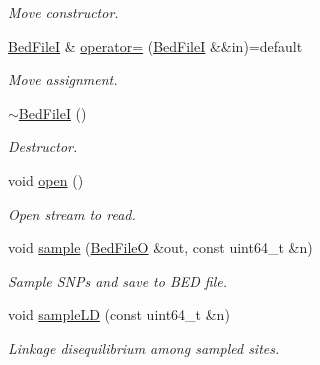 \begin{DoxyCompactItemize}
\begin{DoxyCompactList}\small\item\em Move constructor. \end{DoxyCompactList}\item 
\mbox{\label{classsamp_files_1_1_bed_file_i_a9c99aae36f0c6d710f7940affe35cf58}} 
\hyperlink{classsamp_files_1_1_bed_file_i}{Bed\+FileI} \& \hyperlink{classsamp_files_1_1_bed_file_i_a9c99aae36f0c6d710f7940affe35cf58}{operator=} (\hyperlink{classsamp_files_1_1_bed_file_i}{Bed\+FileI} \&\&in)=default
\begin{DoxyCompactList}\small\item\em Move assignment. \end{DoxyCompactList}\item 
\mbox{\label{classsamp_files_1_1_bed_file_i_a87823c162cc37744aba01c6617ff682e}} 
\hyperlink{classsamp_files_1_1_bed_file_i_a87823c162cc37744aba01c6617ff682e}{$\sim$\+Bed\+FileI} ()
\begin{DoxyCompactList}\small\item\em Destructor. \end{DoxyCompactList}\item 
\mbox{\label{classsamp_files_1_1_bed_file_i_a36ff04242d3c4bd65c9f1d8be5153997}} 
void \hyperlink{classsamp_files_1_1_bed_file_i_a36ff04242d3c4bd65c9f1d8be5153997}{open} ()
\begin{DoxyCompactList}\small\item\em Open stream to read. \end{DoxyCompactList}\item 
void \hyperlink{classsamp_files_1_1_bed_file_i_ac1050b3b8aec9108ae05285cbdfd85b3}{sample} (\hyperlink{classsamp_files_1_1_bed_file_o}{Bed\+FileO} \&out, const uint64\+\_\+t \&n)
\begin{DoxyCompactList}\small\item\em Sample S\+N\+Ps and save to B\+ED file. \end{DoxyCompactList}\item 
void \hyperlink{classsamp_files_1_1_bed_file_i_ae502304386c409e9312a090a189ab694}{sample\+LD} (const uint64\+\_\+t \&n)
\begin{DoxyCompactList}\small\item\em Linkage disequilibrium among sampled sites. \end{DoxyCompactList}\item 

\end{DoxyCompactItemize}
